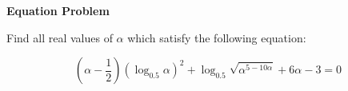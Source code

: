 \documentclass{article}
\begin{document}
\textbf{Equation Problem}

Find all real values of $ \alpha $ which satisfy the following equation:

\begin{displaymath}
  \left( \alpha - \frac {1}{2} \right) \left( \log_{0.5} \alpha \right) ^2 + \log_{0.5} \sqrt{\alpha^{5-10\alpha}} + 6\alpha - 3 = 0
\end{displaymath}
\end{document}
